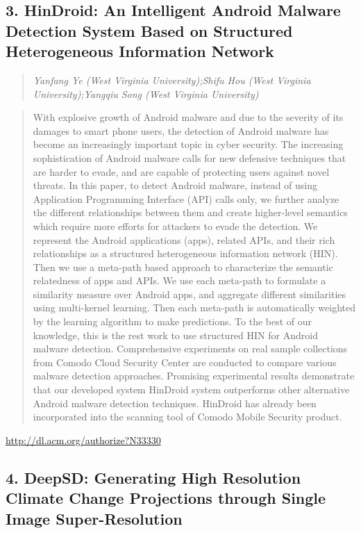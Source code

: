 \documentclass{article}
\begin{document}
\subsection{3. HinDroid: An Intelligent Android Malware Detection System Based on Structured Heterogeneous Information Network}

\begin{quote}
\footnotesize{\textit{Yanfang Ye (West Virginia University);Shifu Hou (West Virginia University);Yangqiu Song (West Virginia University)}}

\end{quote}

\begin{quote}
With explosive growth of Android malware and due to the severity of its damages to smart phone users, the detection of Android malware has become an increasingly important topic in cyber security. The increasing sophistication of Android malware calls for new defensive techniques that are harder to evade, and are capable of protecting users against novel threats. In this paper, to detect Android malware, instead of using Application Programming Interface (API) calls only, we further analyze the different relationships between them and create higher-level semantics which require more efforts for attackers to evade the detection. We represent the Android applications (apps), related APIs, and their rich relationships as a structured heterogeneous information network (HIN). Then we use a meta-path based approach to characterize the semantic relatedness of apps and APIs. We use each meta-path to formulate a similarity measure over Android apps, and aggregate different similarities using multi-kernel learning. Then each meta-path is automatically weighted by the learning algorithm to make predictions. To the best of our knowledge, this is the rest work to use structured HIN for Android malware detection. Comprehensive experiments on real sample collections from Comodo Cloud Security Center are conducted to compare various malware detection approaches. Promising experimental results demonstrate that our developed system HinDroid system outperforms other alternative Android malware detection techniques. HinDroid has already been incorporated into the scanning tool of Comodo Mobile Security product.
\end{quote}

\href{http://dl.acm.org/authorize?N33330}{http://dl.acm.org/authorize?N33330}

\subsection{4. DeepSD: Generating High Resolution Climate Change Projections through Single Image Super-Resolution}
\end{document}
